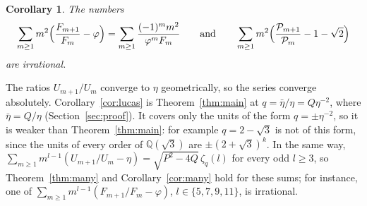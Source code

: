 \documentclass[11pt]{amsart}
\newtheorem{corollary}[theorem]{Corollary}
\theoremstyle{definition}
\theoremstyle{remark}
\numberwithin{equation}{section}
\newcommand{\QQ}{\mathbb{Q}}
\begin{document}
\begin{corollary}\label{cor:fib}
The numbers
\[
\sum_{m\ge1}m^2\Bigl(\frac{F_{m+1}}{F_m}-\varphi\Bigr)=\sum_{m\ge1}\frac{(-1)^mm^2}{\varphi^mF_m}
\qquad\text{and}\qquad
\sum_{m\ge1}m^2\Bigl(\frac{\mathcal P_{m+1}}{\mathcal P_m}-1-\sqrt2\Bigr)
\]
are irrational.
\end{corollary}

The ratios $U_{m+1}/U_m$ converge to $\eta$ geometrically, so the series converge absolutely. Corollary~\ref{cor:lucas}
is Theorem~\ref{thm:main} at $q=\bar\eta/\eta=Q\eta^{-2}$, where $\bar\eta=Q/\eta$ (Section~\ref{sec:proof}). It
covers only the units of the form $q=\pm\eta^{-2}$, so it is weaker than Theorem~\ref{thm:main}: for example $q=2-\sqrt3$ is not of
this form, since the units of every order of $\QQ(\sqrt3)$ are $\pm(2+\sqrt3)^k$. In the same way,
$\sum_{m\ge1}m^{l-1}(U_{m+1}/U_m-\eta)=\sqrt{P^2-4Q}\,\zeta_q(l)$ for every odd $l\ge3$, so Theorem~\ref{thm:many} and
Corollary~\ref{cor:many} hold for these sums; for instance, one of $\sum_{m\ge1}m^{l-1}(F_{m+1}/F_m-\varphi)$,
$l\in\{5,7,9,11\}$, is irrational.
\end{document}
